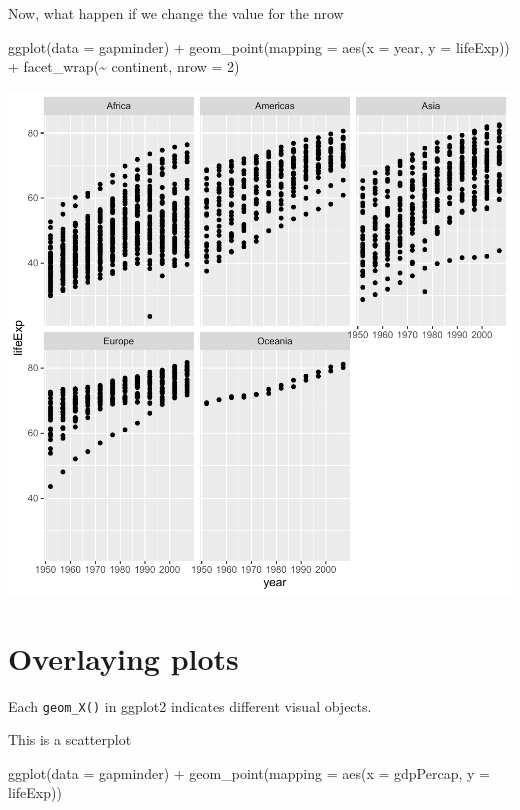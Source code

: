 \documentclass[
]{book}
\makeatletter
\newenvironment{Shaded}{\begin{snugshade}}{\end{snugshade}}
\newcommand{\AttributeTok}[1]{\textcolor[rgb]{0.61,0.61,0.61}{#1}}
\newcommand{\DecValTok}[1]{\textcolor[rgb]{0.06,0.06,0.06}{#1}}
\newcommand{\FunctionTok}[1]{\textcolor[rgb]{0,0,0}{#1}}
\newcommand{\NormalTok}[1]{#1}
\newcommand{\SpecialCharTok}[1]{\textcolor[rgb]{0,0,0}{#1}}
\newenvironment{kframe}{%
\medskip{}
\setlength{\fboxsep}{.8em}
 \def\at@end@of@kframe{}%
 \ifinner\ifhmode%
  \def\at@end@of@kframe{\end{minipage}}%
  \begin{minipage}{\columnwidth}%
 \fi\fi%
 \def\FrameCommand##1{\hskip\@totalleftmargin \hskip-\fboxsep
 \colorbox{shadecolor}{##1}\hskip-\fboxsep
     \hskip-\linewidth \hskip-\@totalleftmargin \hskip\columnwidth}%
 \MakeFramed {\advance\hsize-\width
   \@totalleftmargin\z@ \linewidth\hsize
   \@setminipage}}%
 {\par\unskip\endMakeFramed%
 \at@end@of@kframe}
\renewenvironment{Shaded}{\begin{kframe}}{\end{kframe}}
\makeatother
\begin{document}
Now, what happen if we change the value for the nrow

\begin{Shaded}
\begin{Highlighting}[]
\FunctionTok{ggplot}\NormalTok{(}\AttributeTok{data =}\NormalTok{ gapminder) }\SpecialCharTok{+}
  \FunctionTok{geom\_point}\NormalTok{(}\AttributeTok{mapping =} \FunctionTok{aes}\NormalTok{(}\AttributeTok{x =}\NormalTok{ year, }\AttributeTok{y =}\NormalTok{ lifeExp)) }\SpecialCharTok{+} 
  \FunctionTok{facet\_wrap}\NormalTok{(}\SpecialCharTok{\textasciitilde{}}\NormalTok{ continent, }\AttributeTok{nrow =} \DecValTok{2}\NormalTok{)}
\end{Highlighting}
\end{Shaded}

\begin{center}\includegraphics[width=0.7\linewidth,keepaspectratio]{Multivariable_Data_Analysis_files/figure-latex/unnamed-chunk-24-1} \end{center}

\hypertarget{overlaying-plots}{%
\section{Overlaying plots}\label{overlaying-plots}}

Each \texttt{geom\_X()} in ggplot2 indicates different visual objects.

This is a scatterplot

\begin{Shaded}
\begin{Highlighting}[]
\FunctionTok{ggplot}\NormalTok{(}\AttributeTok{data =}\NormalTok{ gapminder) }\SpecialCharTok{+}
  \FunctionTok{geom\_point}\NormalTok{(}\AttributeTok{mapping =} \FunctionTok{aes}\NormalTok{(}\AttributeTok{x =}\NormalTok{ gdpPercap, }\AttributeTok{y =}\NormalTok{ lifeExp))}
\end{Highlighting}
\end{Shaded}
\end{document}
